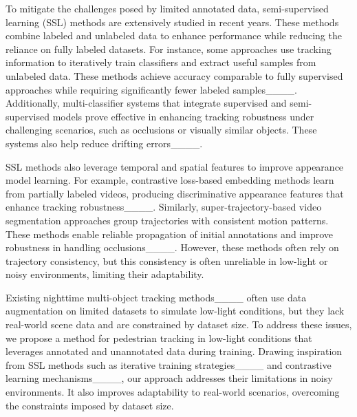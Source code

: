 To mitigate the challenges posed by limited annotated data, semi-supervised learning (SSL) methods are extensively studied in recent years. These methods combine labeled and unlabeled data to enhance performance while reducing the reliance on fully labeled datasets. For instance, some approaches use tracking information to iteratively train classifiers and extract useful samples from unlabeled data. These methods achieve accuracy comparable to fully supervised approaches while requiring significantly fewer labeled samples____. Additionally, multi-classifier systems that integrate supervised and semi-supervised models prove effective in enhancing tracking robustness under challenging scenarios, such as occlusions or visually similar objects. These systems also help reduce drifting errors____.

SSL methods also leverage temporal and spatial features to improve appearance model learning. For example, contrastive loss-based embedding methods learn from partially labeled videos, producing discriminative appearance features that enhance tracking robustness____. Similarly, super-trajectory-based video segmentation approaches group trajectories with consistent motion patterns. These methods enable reliable propagation of initial annotations and improve robustness in handling occlusions____. However, these methods often rely on trajectory consistency, but this consistency is often unreliable in low-light or noisy environments, limiting their adaptability.

Existing nighttime multi-object tracking methods____ often use data augmentation on limited datasets to simulate low-light conditions, but they lack real-world scene data and are constrained by dataset size. To address these issues, we propose a method for pedestrian tracking in low-light conditions that leverages annotated and unannotated data during training. Drawing inspiration from SSL methods such as iterative training strategies____ and contrastive learning mechanisms____, our approach addresses their limitations in noisy environments. It also improves adaptability to real-world scenarios, overcoming the constraints imposed by dataset size.